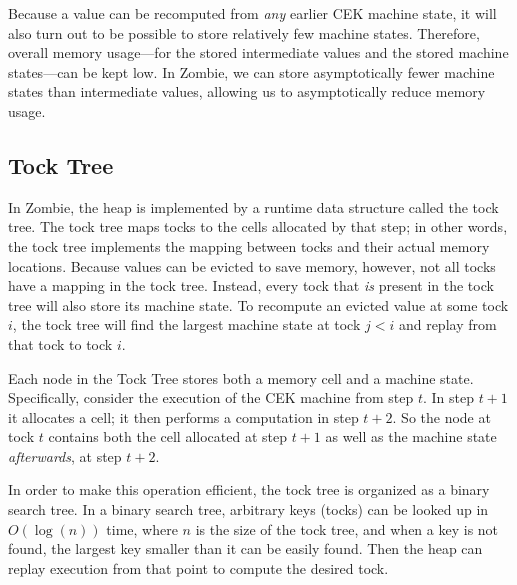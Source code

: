 Because a value can be recomputed from \emph{any} earlier CEK machine state, it will also turn out to be possible to store relatively few machine states. Therefore, overall memory usage---for the stored intermediate values and the stored machine states---can be kept low. In Zombie, we can store asymptotically fewer machine states than intermediate values, allowing us to asymptotically reduce memory usage.

\subsection{Tock Tree}

In Zombie, the heap is implemented by a runtime data structure called the tock tree. The tock tree maps tocks to the cells allocated by that step; in other words, the tock tree implements the mapping between tocks and their actual memory locations. Because values can be evicted to save memory, however, not all tocks have a mapping in the tock tree. Instead, every tock that \emph{is} present in the tock tree will also store its machine state. To recompute an evicted value at some tock $i$, the tock tree will find the largest machine state at tock $j < i$ and replay from that tock to tock $i$.

Each node in the Tock Tree stores both a memory cell and a machine state. Specifically, consider the execution of the CEK machine from step $t$. In step $t + 1$ it allocates a cell; it then performs a computation in step $t + 2$. So the node at tock $t$ contains both the cell allocated at step $t + 1$ as well as the machine state \emph{afterwards}, at step $t + 2$.

In order to make this operation efficient, the tock tree is organized as a binary search tree. In a binary search tree, arbitrary keys (tocks) can be looked up in $O(\log(n))$ time, where $n$ is the size of the tock tree, and when a key is not found, the largest key smaller than it can be easily found. Then the heap can replay execution from that point to compute the desired tock.

